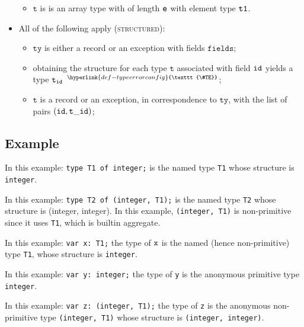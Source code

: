\documentclass{book}
\newcommand\TypeErrorConfig[0]{\hyperlink{def-typeerrorconfig}{\texttt{\#TE}}}
\newcommand\ProseOrTypeError[0]{\hyperlink{def-proseortypeerror}{$^{\TypeErrorConfig}$}}
\newcommand\vt[0]{\texttt{t}}
\newcommand\tty[0]{\texttt{ty}}
\newcommand\fields[0]{\texttt{fields}}
\begin{document}
\begin{itemize}
\begin{itemize}
    \item $\vt$ is is an array type with of length $\texttt{e}$ with element type $\texttt{t1}$.
  \end{itemize}
\item All of the following apply (\textsc{structured}):
  \begin{itemize}
  \item $\tty$ is either a record or an exception with fields $\fields$;
  \item obtaining the structure for each type $\vt$ associated with field $\texttt{id}$ yields a type $\vt_\id$ \ProseOrTypeError;
  \item $\vt$ is a record or an exception, in correspondence to $\tty$, with the list of pairs $(\id, \vt\_\id)$;
  \end{itemize}
\end{itemize}

\subsection{Example}
In this example:
\texttt{type T1 of integer;} is the named type \texttt{T1}
whose structure is \texttt{integer}.

In this example:
\texttt{type T2 of (integer, T1);}
is the named type \texttt{T2} whose structure is (integer, integer). In this
example, \texttt{(integer, T1)} is non-primitive since it uses \texttt{T1}, which is builtin aggregate.

In this example:
\texttt{var x: T1;}
the type of $\texttt{x}$ is the named (hence non-primitive) type \texttt{T1}, whose structure
is \texttt{integer}.

In this example:
\texttt{var y: integer;}
the type of \texttt{y} is the anonymous primitive type \texttt{integer}.

In this example:
\texttt{var z: (integer, T1);}
the type of \texttt{z} is the anonymous non-primitive type
\texttt{(integer, T1)} whose structure is \texttt{(integer, integer)}.

\end{document}

